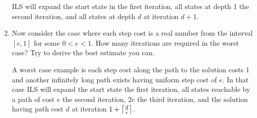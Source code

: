 \documentclass[12pt]{article}
\newenvironment{problem}[2][Problem]{\begin{trivlist}
\item[\hskip \labelsep {\bfseries #1}\hskip \labelsep {\bfseries #2.}]}{\end{trivlist}}
\DeclarePairedDelimiter{\ceil}{\lceil}{\rceil}
\begin{document}
\begin{problem}{1}
\begin{enumerate}
			ILS will expand the start state in the first iteration, all states at depth 1 the second iteration, and all states at depth $d$ at iteration $d+1$.
		\item Now consider the case where each step cost is a real number from the interval $[e,1]$ for some $0 < e < 1$. How many iterations are required in the worst case? Try to derive the best estimate you can.

			A worst case example is each step cost along the path to the solution costs 1 and another infinitely long path exists having uniform step cost of $e$.
			In that case ILS will expand the start state the first iteration, all states reachable by a path of cost $e$ the second iteration, $2e$ the third iteration, and the solution having path cost $d$ at iteration $1+\ceil*{\frac{d}{e}}$.
	\end{enumerate}
\end{problem}
\end{document}
